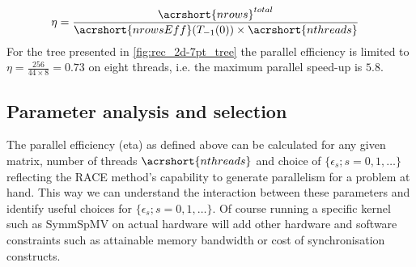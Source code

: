 \begin{align*}
	\eta &= \frac{ \acrshort{nrows}^{total}} {\acrshort{nrowsEff}(T_{-1}(0)) \times \acrshort{nthreads}} 
\end{align*}
For the tree presented in \cref{fig:rec_2d-7pt_tree} the parallel efficiency is limited to $\eta=\frac{256}{44 \times 8 } = 0.73$ on eight threads, i.e. the maximum parallel speed-up is $5.8$.

\subsection{Parameter analysis and selection}
\label{subsec:param_analysis}
The parallel efficiency (\acrshort{eta}) as defined above can be calculated for any given matrix, number of threads $\acrshort{nthreads}$  and choice of $\{\epsilon_s; s=0,1,\ldots\}$ reflecting the RACE method's capability to generate parallelism for a problem at hand. This way we can understand the interaction between these parameters and identify useful choices for $\{\epsilon_s; s=0,1,\ldots\}$. Of course running a specific kernel such as \acrshort{SymmSpMV} on actual hardware will add other hardware and software constraints such as attainable memory bandwidth or cost of synchronisation constructs. 

